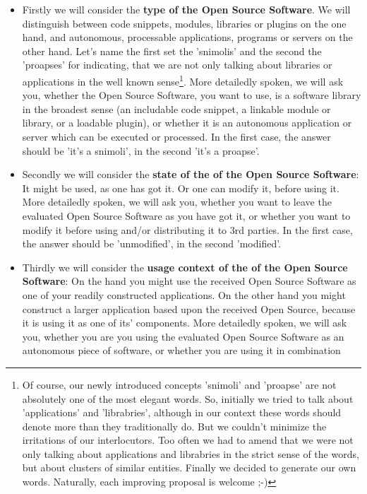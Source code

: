 \begin{itemize}
  \item Firstly we will consider the \textbf{type of the Open Source Software}.
  We will distinguish between code snippets, modules, libraries or plugins on
  the one hand, and autonomous, processable applications, programs or servers on
  the other hand. Let's name the first set the 'snimolis' and the second the
  'proapses' for indicating, that we are not only talking about libraries or
  applications in the well known sense\footnote{Of course, our newly introduced
  concepts 'snimoli' and 'proapse' are not absolutely one of the most elegant
  words. So, initially we tried to talk about 'applications' and 'librabries',
  although in our context these words should denote more than they traditionally
  do. But we couldn't minimize the irritations of our interlocutors. Too often
  we had to amend that we were not only talking about applications and
  librabries in the strict sense of the words, but about clusters of similar
  entities. Finally we decided to generate our own words. Naturally, each
  improving proposal is welcome ;-) }. More detailedly spoken, we will ask you,
  whether the Open Source Software, you want to use, is a software library in
  the broadest sense (an includable code snippet, a linkable module or library,
  or a loadable plugin), or whether it is an autonomous application or server
  which can be executed or processed. In the first case, the answer should be
  'it's a snimoli', in the second 'it's a proapse'.
  \item Secondly we will consider the \textbf{state of the of the Open Source
  Software}: It might be used, as one has got it. Or one can modify it, before
  using it. More detailedly spoken, we will ask you, whether you want to leave
  the evaluated Open Source Software as you have got it, or whether you want to
  modify it before using and/or distributing it to 3rd parties. In the first
  case, the answer should be 'unmodified', in the second 'modified'.
  \item Thirdly we will consider the \textbf{usage context of the of the Open
  Source Software}: On the hand you might use the received Open Source Software
  as one of your readily constructed applications. On the other hand you might
  construct a larger application based upon the received Open Source, because it
  is using it as one of its' components. More detailedly spoken, we will ask
  you, whether you are you using the evaluated Open Source Software as an
  autonomous piece of software, or whether you are using it in combination

\end{itemize}
